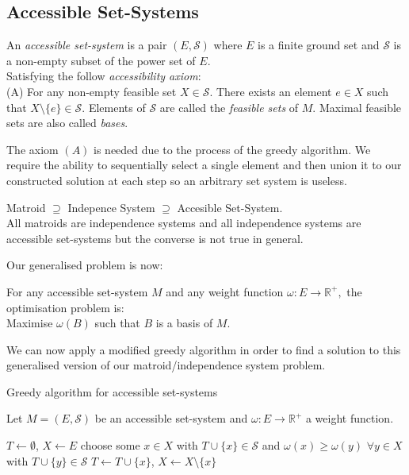 \documentclass[../main.tex]{subfiles}
\begin{document}
\subsection{Accessible Set-Systems}
\begin{defn}
An \textit{accessible set-system} is a pair $(E,\mathcal{S})$ where $E$ is a finite ground set and $\mathcal{S}$ is a non-empty subset of the power set of $E.$\\
Satisfying the follow \textit{accessibility axiom}:\\
(A) For any non-empty feasible set $X \in \mathcal{S}.$ There exists an element $e \in X$ such that $X \setminus \{e\} \in \mathcal{S}.$
Elements of $\mathcal{S}$ are called the \textit{feasible sets} of $M.$ Maximal feasible sets are also called \textit{bases}.
\end{defn}

The axiom $(A)$ is needed due to the process of the greedy algorithm. We require the ability to sequentially select a single element and then union it to our constructed solution at each step so an arbitrary set system is useless.

\begin{rem}
Matroid $\supseteq$ Indepence System $\supseteq$ Accesible Set-System.\\
All matroids are independence systems and all independence systems are accessible set-systems but the converse is not true in general.
\end{rem}

\noindent Our generalised problem is now:
\begin{prop}
For any accessible set-system $M$ and any weight function $\omega:E \longrightarrow \mathbb{R^+},$ the optimisation problem is:\\
 Maximise $\omega(B)$ such that $B$ is a basis of $M.$
\end{prop}
\noindent We can now apply a modified greedy algorithm in order to find a solution to this generalised version of our matroid/independence system problem.

\begin{algorithm}[H]
\caption{Greedy algorithm for accessible set-systems}\label{modified_greedy}
Let $M=(E,\mathcal{S})$ be an accessible set-system and $\omega:E \longrightarrow \mathbb{R^+}$ a weight function.
\begin{algorithmic}[1]
\State $T \gets \emptyset$, $X \gets E$
\State choose some $x \in X$ with $T \cup \{x\} \in \mathcal{S}$ and
\State $\omega(x) \geq \omega(y)$ $\forall y \in X$ with $T \cup \{y\} \in \mathcal{S}$
\State $T \gets T \cup \{x\}$, $X \gets X \setminus \{x\}$
\EndWhile
\EndProcedure
\end{algorithmic}
\end{algorithm}
\end{document}
